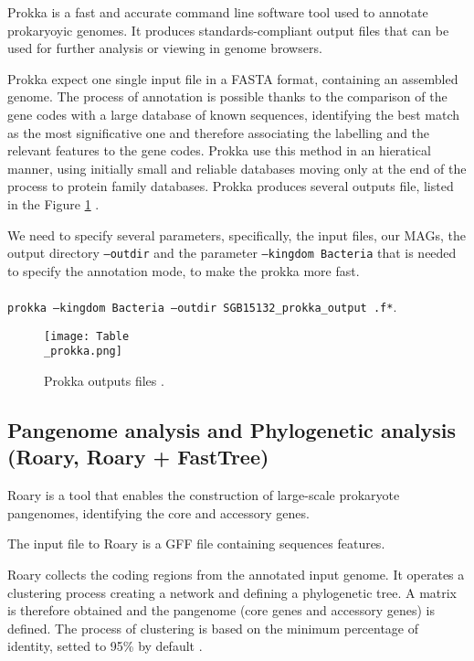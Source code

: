 \documentclass[a4paper,titlepage, oneside]{book}
\newcommand{\code}[1]{\colorbox{light-gray}{\texttt{#1}}}
\begin{document}
Prokka is a fast and accurate command line software tool used to annotate prokaryoyic genomes.  It produces standards-compliant output files that can be used for further analysis or viewing in genome browsers.

Prokka expect one single input file in a FASTA format, containing an assembled genome. The process of annotation is possible thanks to the comparison of the gene codes with a large database of known sequences, identifying the best match as the most significative one and therefore associating the labelling and the relevant features to the gene codes. Prokka use this method in an hieratical manner, using initially small and reliable databases moving only at the end of the process to protein family databases.
Prokka produces several outputs file, listed in the Figure \ref{fig:prokka-output}  \cite{Prokka}.

We need to specify several parameters, specifically, the input files, our MAGs, the output directory \code{--outdir} and the parameter \code{--kingdom Bacteria} that is needed to specify the annotation mode, to make the prokka more fast.
\\ \newline \\
\code{prokka --kingdom Bacteria --outdir SGB15132\_prokka\_output .f*}.


\begin{figure}[ht]
\centering
\texttt{[image: Table\\\_prokka.png]}
\caption{Prokka outputs files \cite{Prokka}.}
\label{fig:prokka-output}
\end{figure}

\subsection{Pangenome analysis and Phylogenetic analysis (Roary, Roary + FastTree)}

Roary is a tool that enables the construction of large-scale prokaryote pangenomes, identifying the core and accessory genes.

The input file to Roary is a GFF file containing sequences features. 

Roary collects the coding regions from the annotated input genome. It operates a clustering process creating a network and defining a phylogenetic tree. A matrix is therefore obtained and the pangenome (core genes and accessory genes) is defined.  The process of clustering is based on the minimum percentage of identity, setted to 95\% by default \cite{Roary}.
\end{document}
